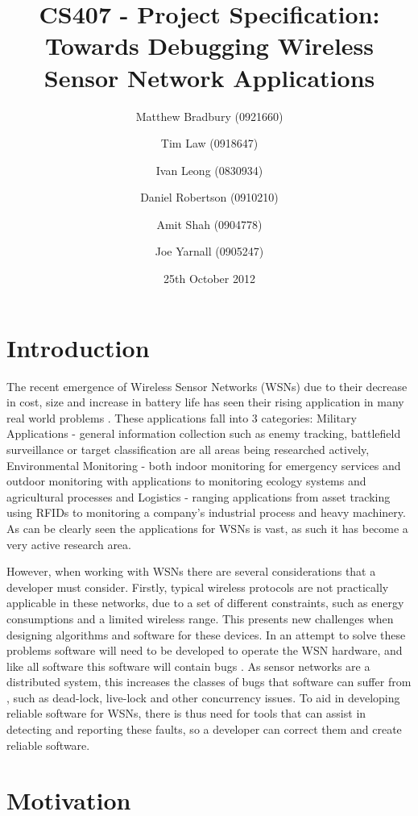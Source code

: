 \documentclass[a4paper]{article}
\title{CS407 - Project Specification:\\
Towards Debugging Wireless Sensor Network Applications}
\date{25th October 2012}
\author{
	Matthew Bradbury (0921660) \and
	Tim Law (0918647) \and
	Ivan Leong (0830934) \and
	Daniel Robertson (0910210) \and
	Amit Shah (0904778) \and
	Joe Yarnall (0905247)
}
\begin{document}
\maketitle

\pagestyle{empty}
\thispagestyle{empty}

\newpage

\pagestyle{plain}
\setcounter{page}{1}

\tableofcontents
\clearpage


\section{Introduction}
The recent emergence of Wireless Sensor Networks (WSNs) due to their decrease in cost, size and increase in battery life has seen their rising application in many real world problems \cite{wsnapps}. These applications fall into 3 categories: Military Applications - general information collection such as enemy tracking, battlefield surveillance or target classification are all areas being researched actively, Environmental Monitoring - both indoor monitoring for emergency services and outdoor monitoring with applications to monitoring ecology systems and agricultural processes and Logistics - ranging applications from asset tracking using RFIDs to monitoring a company's industrial process and heavy machinery. As can be clearly seen the applications for WSNs is vast, as such it has become a very active research area.

However, when working with WSNs there are several considerations that a developer must consider. Firstly, typical wireless protocols are not practically applicable in these networks, due to a set of different constraints, such as energy consumptions and a limited wireless range. This presents new challenges when designing algorithms and software for these devices. In an attempt to solve these problems software will need to be developed to operate the WSN hardware, and like all software this software will contain bugs \cite{5010224}. As sensor networks are a distributed system, this increases the classes of bugs that software can suffer from \cite{5010224}, such as dead-lock, live-lock and other concurrency issues. To aid in developing reliable software for WSNs, there is thus need for tools that can assist in detecting and reporting these faults, so a developer can correct them and create reliable software.

\section{Motivation}
\end{document}
